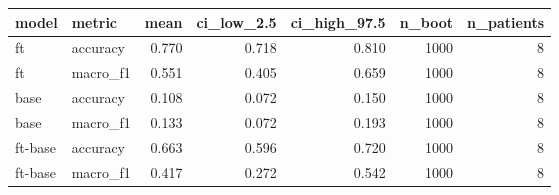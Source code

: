 \begin{tabular}{llrrrrr}
\toprule
model & metric & mean & ci\_low\_2.5 & ci\_high\_97.5 & n\_boot & n\_patients \\
\midrule
ft & accuracy & 0.770 & 0.718 & 0.810 & 1000 & 8 \\
ft & macro\_f1 & 0.551 & 0.405 & 0.659 & 1000 & 8 \\
base & accuracy & 0.108 & 0.072 & 0.150 & 1000 & 8 \\
base & macro\_f1 & 0.133 & 0.072 & 0.193 & 1000 & 8 \\
ft-base & accuracy & 0.663 & 0.596 & 0.720 & 1000 & 8 \\
ft-base & macro\_f1 & 0.417 & 0.272 & 0.542 & 1000 & 8 \\
\bottomrule
\end{tabular}
